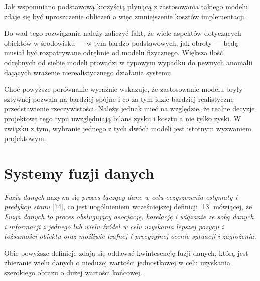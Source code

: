 \par{
Jak wspomniano podstawową korzyścią płynącą z zastosowania takiego modelu zdaje się być uproszczenie obliczeń a więc zmniejszenie kosztów implementacji.
}
\par{
Do wad tego rozwiązania należy zaliczyć fakt, że wiele aspektów dotyczących obiektów w środowisku --- w tym bardzo podstawowych, jak obroty --- będą musiał być rozpatrywane odrębnie od modelu fizycznego. Większa ilość odrębnych od siebie modeli prowadzi w typowym wypadku do pewnych anomalii dających wrażenie nierealistycznego działania systemu.
}
\par{
Choć powyższe porównanie wyraźnie wskazuje, że zastosowanie modelu bryły sztywnej pozwala na bardziej spójne i co za tym idzie bardziej realistyczne przedstawienie rzeczywistości. Należy jednak mieć na względzie, że realne decyzje projektowe tego typu uwzględniają bilans zysku i kosztu a nie tylko zyski. W związku z tym, wybranie jednego z tych dwóch modeli jest istotnym wyzwaniem projektowym.
}

\section[Systemy fuzji danych][Systemy fuzji danych]{Systemy fuzji danych}
\par{
\textit{Fuzją danych} nazywa się \textit{proces łączący dane w celu oczyszczenia estymaty i predykcji stanu} [14], co jest uogólnieniem wcześniejszej definicji [13] mówiącej, że \textit{Fuzja danych to proces obsługujący asocjację, korelację i wiązanie ze sobą danych i informacji z jednego lub wielu źródeł w celu uzyskania lepszej pozycji i tożsamości obiektu oraz możliwie trafnej i precyzyjnej ocenie sytuacji i zagrożenia.}
}
\par{
Obie powyższe definicje zdają się oddawać kwintesencję fuzji danych, którą jest zbieranie wielu danych o niedużej wartości jednostkowej w celu uzyskania szerokiego obrazu o dużej wartości końcowej.
}

